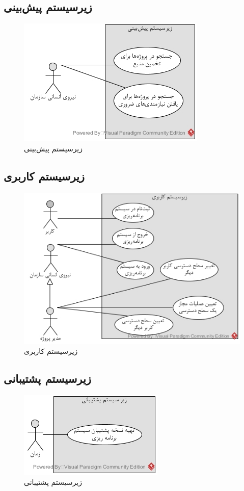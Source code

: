\subsection{زیرسیستم پیش‌بینی}
\begin{figure}[H]
	\centering
	\includegraphics[scale=1]{img/usecase/est}
	\caption{زیرسیستم پیش‌بینی}
\end{figure}

\subsection{زیرسیستم کاربری}
\begin{figure}[H]
	\centering
	\includegraphics[scale=0.9]{img/usecase/user}
	\caption{زیرسیستم کاربری}
\end{figure}

\subsection{زیرسیستم پشتیبانی}
\begin{figure}[H]
	\centering
	\includegraphics[scale=1]{img/usecase/support}
	\caption{زیرسیستم پشتیبانی}
\end{figure}


